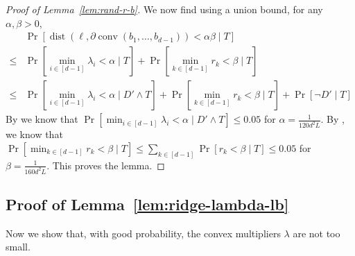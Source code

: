 \documentclass{article}\usepackage[a4paper,margin=20mm]{geometry}
\newcommand{\conv}{\operatorname{conv}}
\newcommand{\dist}{\operatorname{dist}}
\begin{document}
\begin{proof}[Proof of Lemma~\ref{lem:rand-r-b}]
    We now find using a union bound, for any $\alpha,\beta > 0$,
    \begin{align*}
        & \Pr[\dist(\ell,\partial\conv(b_1,\dots,b_{d-1})) < \alpha\beta \mid T] \\
        \leq & \Pr[\min_{i \in [d-1]} \lambda_i < \alpha \mid T] + \Pr[\min_{k \in [d-1]} r_k < \beta \mid T] \\
        \leq & \Pr[\min_{i \in [d-1]} \lambda_i < \alpha \mid D' \wedge T] + \Pr[\min_{k \in [d-1]} r_k < \beta \mid T] + \Pr[\neg D' \mid T]
    \end{align*}
    By  we know that
    $\Pr[\min_{i \in [d-1]} \lambda_i < \alpha \mid D' \wedge T] \leq 0.05$ for $\alpha = \frac{1}{120d^2L}$.
    By , we know that
        $\Pr[\min_{k \in [d-1]} r_k < \beta \mid T]\leq
        \sum_{k\in[d-1]} \Pr[ r_k < \beta \mid T]
        \leq 0.05$ for $\beta = \frac{1}{160d^2L}$.
    This proves the lemma.
\end{proof}


\subsection{Proof of Lemma~\ref{lem:ridge-lambda-lb}}\label{sec:proof-ridge-lambda-lb}
Now we show that, with good probability, the convex multipliers $\lambda$ are not too small.
\end{document}

